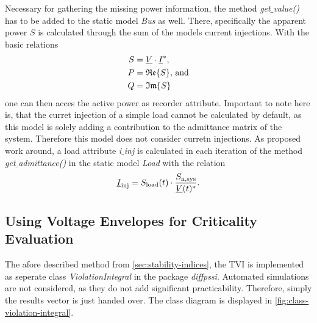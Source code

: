 Necessary for gathering the missing power information, the method \textit{get$\_$value()} has to be added to the static model \textit{Bus} as well.
There, specifically the apparent power $S$ is calculated through the sum of the models current injections.
With the basic relations
\begin{align}
        S&=\underline{V} \cdot \underline{I}^* \notag, \\
        P&=\mathfrak{Re} \{S\}\text{, and} \notag \\
        Q&=\mathfrak{Im} \{S\} \notag
\end{align}
one can then acces the active power as recorder attribute. 
Important to note here is, that the curret injection of a simple load cannot be calculated by default, as this model is solely adding a contribution to the admittance matrix of the system.
Therefore this model does not consider curretn injections.
As proposed work around, a load attribute \textit{i$\_$inj} is calculated in each iteration of the method \textit{get$\_$admittance()} in the static model \textit{Load} with the relation
\begin{align}
        \underline{I}_\mathrm{inj}=S_\mathrm{load}(t) \cdot \frac{S_\mathrm{n,sys}}{\underline{V}(t)^*}. \notag
\end{align}


        
\subsection{Using Voltage Envelopes for Criticality Evaluation}
\label{sec:comb-rating-tool}

The afore described method from \autoref{sec:stability-indices}, the \acs{TVI} is implemented as seperate class \textit{ViolationIntegral} in the package \textit{diffpssi}.
Automated simulations are not considered, as they do not add significant practicability.
Therefore, simply the results vector is just handed over.
The class diagram is displayed in \autoref{fig:class-violation-integral}.

